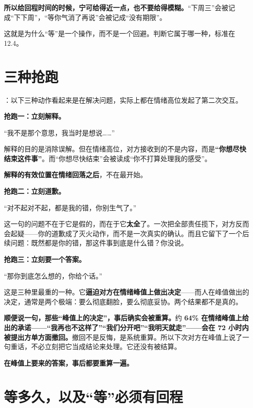 \textbf{所以给回程时间的时候，宁可给得近一点，也不要给得模糊。}“下周三”会被记成“下下周”，“等你气消了再说”会被记成“没有期限”。

这就是为什么“等”是一个操作，而不是一个回避。判断它属于哪一种，标准在 12.4。

\section{三种抢跑}

：以下三种动作看起来是在解决问题，实际上都在情绪高位发起了第二次交互。

\textbf{抢跑一：立刻解释。}

\begin{mdquote}
“我不是那个意思，我当时是想说……”
\end{mdquote}

解释的目的是消除误解。但在情绪高位，对方接收到的不是内容，而是\textbf{“你想尽快结束这件事”}。而“你想尽快结束”会被读成“你不打算处理我的感受”。

\textbf{解释的有效位置在情绪回落之后}，不在最开始。

\textbf{抢跑二：立刻道歉。}

\begin{mdquote}
“对不起对不起，都是我的错，你别生气了。”
\end{mdquote}

这一句的问题不在于它是假的，而在于它\textbf{太全}了。一次把全部责任揽下，对方反而会起疑——你的道歉成了灭火动作，而不是一次真实的确认。而且它留下了一个后续问题：既然都是你的错，那这件事到底是什么错？你没说。

\textbf{抢跑三：立刻要一个答案。}

\begin{mdquote}
“那你到底怎么想的，你给个话。”
\end{mdquote}

这是三种里最重的一种。它\textbf{逼迫对方在情绪峰值上做出决定}——而人在峰值做出的决定，通常是两个极端：要么彻底翻脸，要么彻底妥协。两个结果都不是真的。

\textbf{顺便说一句，那些“峰值上的决定”，事后确实会被重算。}约 \textbf{64\% 在情绪峰值上给出的承诺——“我再也不这样了”“我们分开吧”“我明天就走”——会在 72 小时内被提出方单方面撤回。}撤回不是反悔，是系统重算。所以下次对方在峰值上说了一句重话，不必立刻把它当成结论来处理。它还没有被结算。

\textbf{在峰值上要来的答案，事后都要重算一遍。}

\section{等多久，以及“等”必须有回程}

